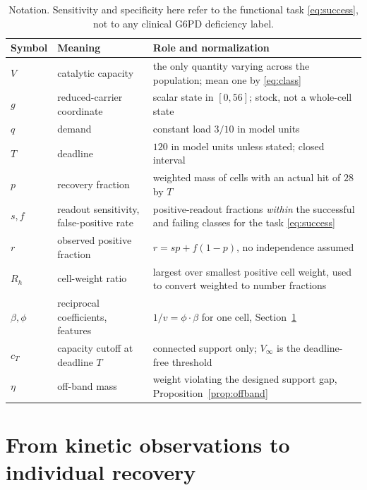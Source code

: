 \documentclass[11pt]{article}
\theoremstyle{definition}
\begin{document}
\begin{table}[ht]
\centering\small
\begin{tabularx}{\linewidth}{@{}ll>{\raggedright\arraybackslash}X@{}}
\toprule
Symbol & Meaning & Role and normalization\\
\midrule
$V$ & catalytic capacity & the only quantity varying across the population;
mean one by \eqref{eq:class}\\
$g$ & reduced-carrier coordinate & scalar state in $[0,56]$; stock, not a
whole-cell state\\
$q$ & demand & constant load $3/10$ in model units\\
$T$ & deadline & $120$ in model units unless stated; closed interval\\
$p$ & recovery fraction & weighted mass of cells with an actual hit of $28$ by
$T$\\
$s,f$ & readout sensitivity, false-positive rate & positive-readout fractions
\emph{within} the successful and failing classes for the task
\eqref{eq:success}\\
$r$ & observed positive fraction & $r=sp+f(1-p)$, no independence assumed\\
$R_h$ & cell-weight ratio & largest over smallest positive cell weight, used
to convert weighted to number fractions\\
$\beta,\phi$ & reciprocal coefficients, features & $1/v=\phi\cdot\beta$ for one
cell, Section~\ref{sec:individual}\\
$c_T$ & capacity cutoff at deadline $T$ & connected support only; $V_\infty$
is the deadline-free threshold\\
$\eta$ & off-band mass & weight violating the designed support gap,
Proposition~\ref{prop:offband}\\
\bottomrule
\end{tabularx}
\caption{Notation. Sensitivity and specificity here refer to the functional
task \eqref{eq:success}, not to any clinical G6PD deficiency
label.}\label{tab:notation}
\end{table}

\section{From kinetic observations to individual recovery}\label{sec:individual}
\end{document}
